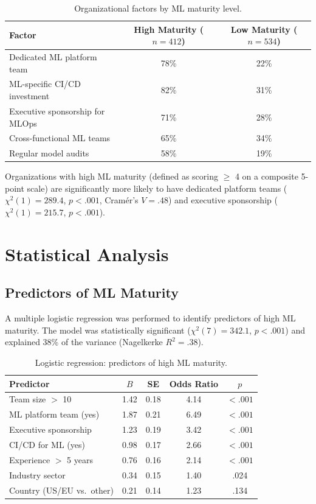 \documentclass[
    language=english,
    doctype=survey-report,
    institution=none,
]{../../omnilatex}
\begin{document}
\begin{table}[htbp]
    \centering
    \caption{Organizational factors by ML maturity level.}
    \label{tab:org-factors}
    \begin{tabular}{@{}lcc@{}}
        \toprule
        Factor & High Maturity ($n = 412$) & Low Maturity ($n = 534$) \\
        \midrule
        Dedicated ML platform team & 78\% & 22\% \\
        ML-specific CI/CD investment & 82\% & 31\% \\
        Executive sponsorship for MLOps & 71\% & 28\% \\
        Cross-functional ML teams & 65\% & 34\% \\
        Regular model audits & 58\% & 19\% \\
        \bottomrule
    \end{tabular}
\end{table}

Organizations with high ML maturity (defined as scoring $\geq$ 4 on a
composite 5-point scale) are significantly more likely to have dedicated
platform teams ($\chi^2(1) = 289.4$, $p < .001$, Cramér's $V = .48$)
and executive sponsorship ($\chi^2(1) = 215.7$, $p < .001$).

\section{Statistical Analysis}
\label{sec:statistics}

\subsection{Predictors of ML Maturity}

A multiple logistic regression was performed to identify predictors of
high ML maturity. The model was statistically significant ($\chi^2(7) = 342.1$,
$p < .001$) and explained 38\% of the variance (Nagelkerke $R^2 = .38$).

\begin{table}[htbp]
    \centering
    \caption{Logistic regression: predictors of high ML maturity.}
    \label{tab:regression}
    \begin{tabular}{@{}lcccc@{}}
        \toprule
        Predictor & $B$ & SE & Odds Ratio & $p$ \\
        \midrule
        Team size $>$ 10 & 1.42 & 0.18 & 4.14 & $< .001$ \\
        ML platform team (yes) & 1.87 & 0.21 & 6.49 & $< .001$ \\
        Executive sponsorship & 1.23 & 0.19 & 3.42 & $< .001$ \\
        CI/CD for ML (yes) & 0.98 & 0.17 & 2.66 & $< .001$ \\
        Experience $>$ 5 years & 0.76 & 0.16 & 2.14 & $< .001$ \\
        Industry sector & 0.34 & 0.15 & 1.40 & .024 \\
        Country (US/EU vs.\ other) & 0.21 & 0.14 & 1.23 & .134 \\
        \bottomrule
    \end{tabular}
\end{table}
\end{document}
